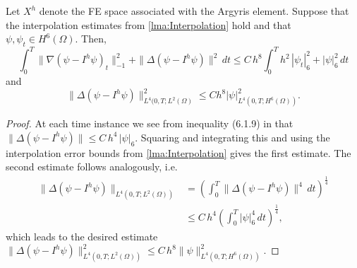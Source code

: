 \begin{lemma} \label{lma:IntegralErrors}
  Let $X^h$ denote the FE space associated with the Argyris element. Suppose
  that the interpolation estimates from \autoref{lma:Interpolation} hold and
  that $\psi, \psi_t \in H^6(\Omega)$. Then,
  \begin{equation}
    \int_{0}^{T}\! \|\nabla \left(\psi - I^h \psi\right)_t\|_{-1}^2 + \|\Delta
    \left(\psi - I^h \psi\right) \|^2\, dt \le C\, h^8
    \int_{0}^{T}\! h^2 \,|\psi_t|_6^2 + |\psi|_6^2\, dt
    \label{eqn:IntegralErrors}
  \end{equation}
  and
  \begin{equation}
    \|\Delta\left( \psi- I^h \psi\right)\|_{L^4(0,T; L^2(\Omega)}^2 \le C h^8
      |\psi|_{L^4(0,T;H^6(\Omega))}^2. \label{eqn:L4Interpolation}
  \end{equation}
\end{lemma}
\begin{proof}
  At each time instance we see from inequality (6.1.9) in \cite{Ciarlet} that
  $\|\Delta\left(\psi - I^h \psi\right)\| \le C\, h^4\, |\psi|_6$. Squaring and
  integrating this and using the interpolation error bounds from
  \autoref{lma:Interpolation} gives the first estimate. The second estimate
  follows analogously, i.e.
  \begin{align*}
    \|\Delta \left(\psi - I^h \psi\right)\|_{L^4(0,T;L^2(\Omega))}
    &= \left(\int_{0}^{T}\! \|\Delta\left(\psi - I^h \psi\right)\|^4\, dt
      \right)^{\frac{1}{4}} \\
    &\le C\, h^4 \left(\int_{0}^{T}\! |\psi|_6^4\, dt\right)^{\frac{1}{4}},
  \end{align*}
  which leads to the desired estimate $\|\Delta\left(\psi - I^h
  \psi\right)\|_{L^4(0,T;L^2(\Omega))}^2 \le C\, h^8
  \|\psi\|_{L^4(0,T;H^6(\Omega))}^2$.
\end{proof}

